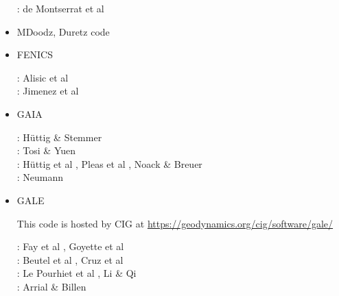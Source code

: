 \begin{itemize}
\begin{scriptsize}
\noindent
\twothousandnineteen: de Montserrat et al \cite{demh19}
\end{scriptsize}

\item {\codefont MDoodz}, Duretz code

{\small
\cite{yatd12}
\cite{yahb13}
\cite{yadm15}
\cite{dumy16}\cite{dupm16}
\cite{chmd19}\cite{dual19}\cite{pedm19}
\cite{poyd20}\cite{bedh20}
}

\item {\codefont FENICS} 

\begin{scriptsize}
\noindent
\twothousandfourteen: Alisic et al \cite{alrk14}\\
\twothousandseventeen: Jimenez et al \cite{jidb17}
\end{scriptsize}


\item {\codefont GAIA} 

\begin{scriptsize}
\noindent
\twothousandeight: H{\"u}ttig \& Stemmer \cite{hust08b} \\
\twothousandeleven: Tosi \& Yuen \cite{toyu11} \\
\twothousandthirteen: H{\"u}ttig et al \cite{hutm13}, Pleas et al \cite{plth13}, Noack \& Breuer \cite{nobr13} \\
\twothousandnineteen: Neumann \cite{neum19}
\end{scriptsize}

\item {\codefont GALE} 

This code is hosted by CIG at \url{https://geodynamics.org/cig/software/gale/}

\begin{scriptsize}
\noindent
\twothousandeight:
Fay et al \cite{fabs08}, Goyette et al \cite{gotc08}\\
\twothousandten:
Beutel et al \cite{beve10}, Cruz et al \cite{crmw10}\\
\twothousandtwelve:
Le Pourhiet et al \cite{lehm12}, Li \& Qi \cite{liqi12}\\
\twothousandthirteen:
Arrial \& Billen \cite{arbi13}
\end{scriptsize}


\end{itemize}
